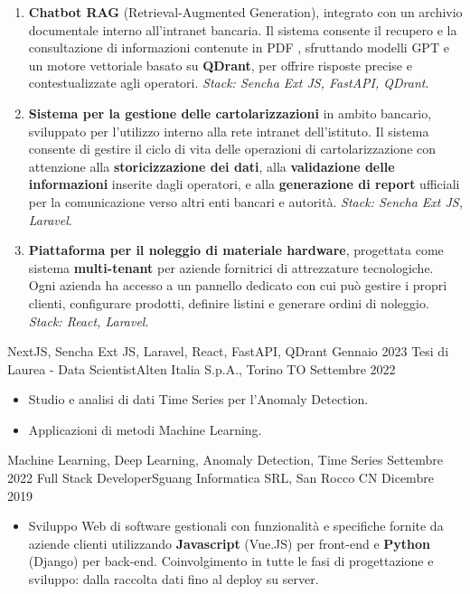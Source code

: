 \begin{experiences}
{\begin{itemize}
\begin{enumerate}
\item \textbf{Chatbot RAG} (Retrieval-Augmented Generation), integrato con un archivio documentale interno all’intranet bancaria. Il sistema consente il recupero e la consultazione di informazioni contenute in PDF , sfruttando modelli GPT e un motore vettoriale basato su \textbf{QDrant}, per offrire risposte precise e contestualizzate agli operatori. \textit{Stack: Sencha Ext JS, FastAPI, QDrant}.

\item \textbf{Sistema per la gestione delle cartolarizzazioni} in ambito bancario, sviluppato per l’utilizzo interno alla rete intranet dell’istituto. Il sistema consente di gestire il ciclo di vita delle operazioni di cartolarizzazione con attenzione alla \textbf{storicizzazione dei dati}, alla \textbf{validazione delle informazioni} inserite dagli operatori, e alla \textbf{generazione di report} ufficiali per la comunicazione verso altri enti bancari e autorità. \textit{Stack: Sencha Ext JS, Laravel}.

\item \textbf{Piattaforma per il noleggio di materiale hardware}, progettata come sistema \textbf{multi-tenant} per aziende fornitrici di attrezzature tecnologiche. Ogni azienda ha accesso a un pannello dedicato con cui può gestire i propri clienti, configurare prodotti, definire listini e generare ordini di noleggio. \textit{Stack: React, Laravel}.

		\end{enumerate}
	\end{itemize}
        }
	{NextJS, Sencha Ext JS, Laravel, React, FastAPI, QDrant}
	\emptySeparator
	\emptySeparator
	\experience
	{Gennaio 2023}   {Tesi di Laurea - Data Scientist}{Alten Italia S.p.A., Torino TO}
	{Settembre 2022} {
		\begin{itemize}
			\item Studio e analisi di dati Time Series per l'Anomaly Detection.
			\item Applicazioni di metodi Machine Learning.
		\end{itemize}
	}
	{Machine Learning, Deep Learning, Anomaly Detection, Time Series}
	\emptySeparator
	\emptySeparator
	\experience
	{Settembre 2022}   {Full Stack Developer}{Sguang Informatica SRL, San Rocco CN}
	{Dicembre 2019} {
		\begin{itemize}
			\item Sviluppo Web di software gestionali con funzionalità e specifiche fornite da aziende clienti utilizzando \textbf{Javascript} (Vue.JS) per front-end e \textbf{Python} (Django) per back-end. Coinvolgimento in tutte le fasi di progettazione e sviluppo: dalla raccolta dati fino al deploy su server. 
            

\end{itemize}}
\end{experiences}
